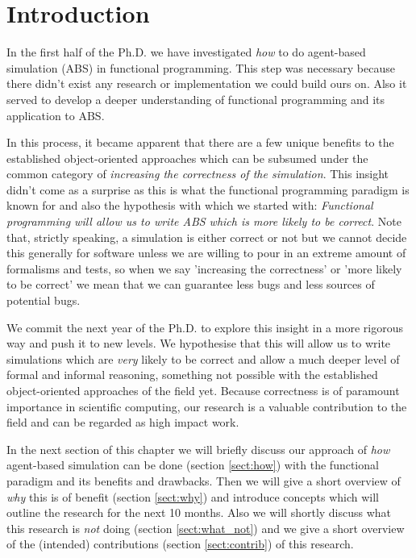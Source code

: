 \chapter{Introduction}
\label{chap:intro}
In the first half of the Ph.D. we have investigated \textit{how} to do agent-based simulation (ABS) in functional programming. This step was necessary because there didn't exist any research or implementation we could build ours on. Also it served to develop a deeper understanding of functional programming and its application to ABS.

In this process, it became apparent that there are a few unique benefits to the established object-oriented approaches which can be subsumed under the common category of \textit{increasing the correctness of the simulation}. This insight didn't come as a surprise as this is what the functional programming paradigm is known for and also the hypothesis with which we started with: \textit{Functional programming will allow us to write ABS which is more likely to be correct}. Note that, strictly speaking, a simulation is either correct or not but we cannot decide this generally for software unless we are willing to pour in an extreme amount of formalisms and tests, so when we say 'increasing the correctness' or 'more likely to be correct' we mean that we can guarantee less bugs and less sources of potential bugs.

We commit the next year of the Ph.D. to explore this insight in a more rigorous way and push it to new levels. We hypothesise that this will allow us to write simulations which are \textit{very} likely to be correct and allow a much deeper level of formal and informal reasoning, something not possible with the established object-oriented approaches of the field yet. Because correctness is of paramount importance in scientific computing, our research is a valuable contribution to the field and can be regarded as high impact work.

In the next section of this chapter we will briefly discuss our approach of \textit{how} agent-based simulation can be done (section \ref{sect:how}) with the functional paradigm and its benefits and drawbacks. Then we will give a short overview of \textit{why} this is of benefit (section \ref{sect:why}) and introduce concepts which will outline the research for the next 10 months. Also we will shortly discuss what this research is \textit{not} doing (section \ref{sect:what_not}) and we give a short overview of the (intended) contributions (section \ref{sect:contrib}) of this research. 

